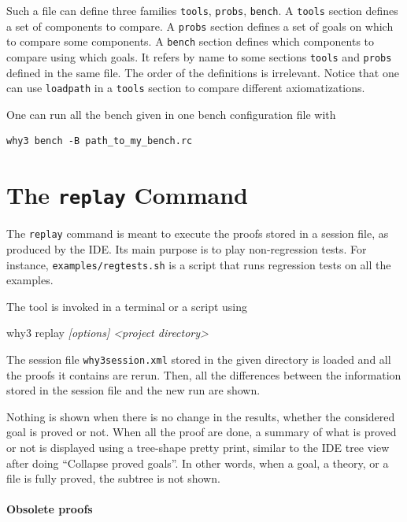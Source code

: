 Such a file can define three families \texttt{tools}, \texttt{probs},
\texttt{bench}. A \texttt{tools} section defines a set of components to
compare. A \texttt{probs} section defines a set of goals on which to compare some
components. A \texttt{bench} section defines which components to
compare using which goals. It refers by name to some sections
\texttt{tools} and \texttt{probs} defined in the same file. The order
of the definitions is irrelevant. Notice that one can use
\texttt{loadpath} in a \texttt{tools} section to compare different
axiomatizations.

One can run all the bench given in one bench configuration file with
\begin{verbatim}
why3 bench -B path_to_my_bench.rc
\end{verbatim}

\section{The \texttt{replay} Command}
\label{sec:why3replayer}

The \texttt{replay} command is meant to execute the proofs
stored in a \why session file, as produced by the IDE. Its
main purpose is to play non-regression tests. For instance,
\texttt{examples/regtests.sh} is a script that runs regression tests on
all the examples.

The tool is invoked in a terminal or a script using
\begin{flushleft}\ttfamily
  why3 replay \textsl{[options] <project directory>}
\end{flushleft}
The session file \texttt{why3session.xml} stored in the given
directory is loaded and all the proofs it contains are rerun. Then,
all the differences between the information stored in the session file and
the new run are shown.

Nothing is shown when there is no change in the results, whether the
considered goal is proved or not. When all the proof
are done, a summary of what is proved or not is displayed using a
tree-shape pretty print, similar to the IDE tree view after doing
``Collapse proved goals''. In other words, when a goal, a theory, or a
file is fully proved, the subtree is not shown.

\paragraph{Obsolete proofs}

